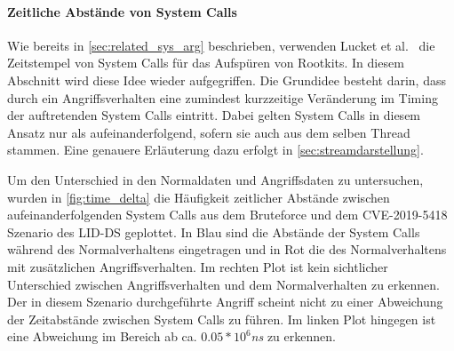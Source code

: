                 \paragraph{Zeitliche Abstände von System Calls}
                    Wie bereits in \autoref{sec:related_sys_arg} beschrieben, verwenden Lucket et al.~\cite{TIMINGLUCKETT2016} die Zeitstempel von System Calls für das Aufspüren von Rootkits.
                    In diesem Abschnitt wird diese Idee wieder aufgegriffen.
                    Die Grundidee besteht darin, dass durch ein Angriffsverhalten eine zumindest kurzzeitige Veränderung im Timing der auftretenden System Calls eintritt.
                    Dabei gelten System Calls in diesem Ansatz nur als aufeinanderfolgend, sofern sie auch aus dem selben Thread stammen.
                    Eine genauere Erläuterung dazu erfolgt in \autoref{sec:streamdarstellung}.\par\medskip

                    Um den Unterschied in den Normaldaten und Angriffsdaten zu untersuchen, wurden in \autoref{fig:time_delta} die Häufigkeit zeitlicher Abstände zwischen aufeinanderfolgenden System Calls aus dem Bruteforce und dem CVE-2019-5418 Szenario des \ac{LID-DS} geplottet.
                    In Blau sind die Abstände der System Calls während des Normalverhaltens eingetragen und in Rot die des Normalverhaltens mit zusätzlichen Angriffsverhalten.
                    Im rechten Plot ist kein sichtlicher Unterschied zwischen Angriffsverhalten und dem Normalverhalten zu erkennen.
                    Der in diesem Szenario durchgeführte Angriff scheint nicht zu einer Abweichung der Zeitabstände zwischen System Calls zu führen.
                    Im linken Plot hingegen ist eine Abweichung im Bereich ab ca. $0.05*10^{6}$\textit{ns} zu erkennen.\par\medskip

